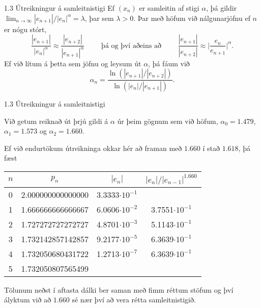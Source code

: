 %
\begin{frame}{1.3 Útreikningur á samleitnistigi} 
Ef $(x_n)$ er samleitin af stigi $\alpha$, þá gildir
$\lim_{n\to \infty}|e_{n+1}|/|e_n|^\alpha=\lambda$, þar sem
$\lambda>0$. Þar með höfum við nálgunarjöfnu ef $n$ er nógu stórt,
\begin{equation*}
    \dfrac{|e_{n+1}|}{|e_n|^\alpha} \approx
    \dfrac{|e_{n+2}|}{|e_{n+1}|^\alpha}
    \qquad \text{ þá og því aðeins að } \qquad 
    \dfrac{|e_{n+1}|}{|e_{n+2}|} \approx
    \bigg|\dfrac{e_{n}}{e_{n+1}} \bigg|^\alpha.
\end{equation*}\pause
Ef við lítum á þetta sem jöfnu og leysum út $\alpha$, þá fáum við
\begin{equation*}
    \alpha_n = 
    \dfrac{\ln(|e_{n+1}|/|e_{n+2}|)}{\ln(|e_{n}|/|e_{n+1}|)}.
\end{equation*}
\end{frame}
%

%
\begin{frame}{1.3 Útreikningur á samleitnistigi} 

Við getum reiknað út þrjú gildi á $\alpha$  úr þeim gögnum sem við
höfum, $\alpha_0= 1.479$, $\alpha_1 = 1.573$ og $\alpha_2=1.660$. \pause 

Ef við endurtökum útreikninga okkar hér að framan með $1.660$ í stað
$1.618$, þá fæst  

\begin{center}
\begin{tabular}{c|c|c|c|}
$n$ & $p_n$ & $|e_n|$ & $|e_n|/|e_{n-1}|^{1.660}$ \\  \hline 
0&  2.000000000000000 & 3.3333$\cdot 10^{-1}$ &\\
1&  1.666666666666667 & 6.0606$\cdot 10^{-2}$ & 3.7551$\cdot 10^{-1}$\\
2&  1.727272727272727 & 4.8701$\cdot 10^{-3}$ & 5.1143$\cdot 10^{-1}$\\
3&  1.732142857142857 & 9.2177$\cdot 10^{-5}$ & 6.3639$\cdot 10^{-1}$\\
4&  1.732050680431722 & 1.2713$\cdot 10^{-7}$ & 6.3639$\cdot 10^{-1}$\\
5&  1.732050807565499 & &\\
\end{tabular}
\end{center}
Tölunum neðst í aftasta dálki ber saman með fimm réttum stöfum og því
ályktum við að $1.660$ sé nær því að vera rétta samleitnistigið.  
\end{frame}

